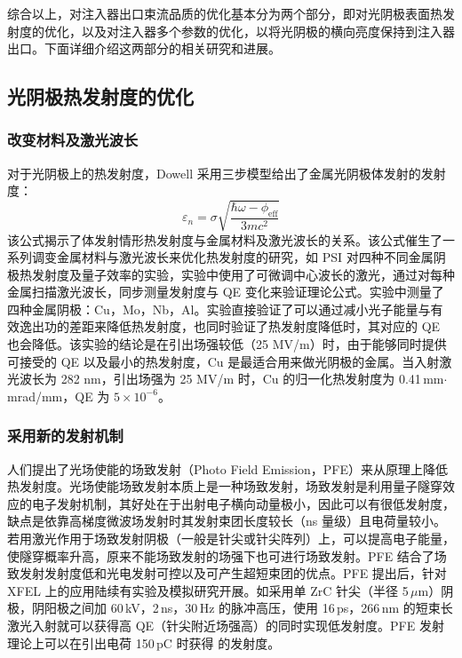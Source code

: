 综合以上，对注入器出口束流品质的优化基本分为两个部分，即对光阴极表面热发射度的优化，以及对注入器多个参数的优化，以将光阴极的横向亮度保持到注入器出口。下面详细介绍这两部分的相关研究和进展。

\subsection{光阴极热发射度的优化}
\subsubsection{改变材料及激光波长}
对于光阴极上的热发射度，Dowell 采用三步模型给出了金属光阴极体发射的发射度\cite{Dowell:2006aa,dowell2009quantum}：
\[
	\varepsilon_{n} =\sigma\sqrt{\dfrac{\hbar\omega-\phi_{\mathrm{eff}}}{3mc^2}}
\]
该公式揭示了体发射情形热发射度与金属材料及激光波长的关系。该公式催生了一系列调变金属材料与激光波长来优化热发射度的研究，如 PSI 对四种不同金属阴极热发射度及量子效率的实验\cite{hauri2010intrinsic}，实验中使用了可微调中心波长的激光，通过对每种金属扫描激光波长，同步测量发射度与 QE 变化来验证理论公式。实验中测量了四种金属阴极：Cu，Mo，Nb，Al。实验直接验证了可以通过减小光子能量与有效逸出功的差距来降低热发射度，也同时验证了热发射度降低时，其对应的 QE 也会降低。该实验的结论是在引出场强较低（25 MV/m）时，由于能够同时提供可接受的 QE 以及最小的热发射度，Cu 是最适合用来做光阴极的金属。当入射激光波长为 282 nm，引出场强为 25 MV/m  时，Cu 的归一化热发射度为 0.41\,mm$\cdot$mrad/mm，QE 为 $5\times10^{-6}$\cite{hauri2010intrinsic}。

\subsubsection{采用新的发射机制}
人们提出了光场使能的场致发射（Photo Field Emission，PFE）来从原理上降低热发射度\cite{Reifenberger:1979aa}。光场使能场致发射本质上是一种场致发射，场致发射是利用量子隧穿效应的电子发射机制，其好处在于出射电子横向动量极小，因此可以有很低发射度，缺点是依靠高梯度微波场发射时其发射束团长度较长（ns 量级）且电荷量较小。若用激光作用于场致发射阴极（一般是针尖或针尖阵列）上，可以提高电子能量，使隧穿概率升高，原来不能场致发射的场强下也可进行场致发射。PFE 结合了场致发射发射度低和光电发射可控以及可产生超短束团的优点。PFE 提出后，针对 XFEL 上的应用陆续有实验\cite{Ganter:2008aa,Mingels:2012aa,Mingels:2013aa,Mingels:2014aa}及模拟研究\cite{Fallahi:2014aa}开展。如采用单 ZrC 针尖（半径 5\,$\mu$m）阴极，阴阳极之间加 60\,kV，2\,ns，30\,Hz 的脉冲高压，使用 16\,ps，266\,nm 的短束长激光入射就可以获得高 QE（针尖附近场强高）的同时实现低发射度。PFE 发射理论上可以在引出电荷 150\,pC 时获得  的发射度\cite{Mingels:2014aa}。

